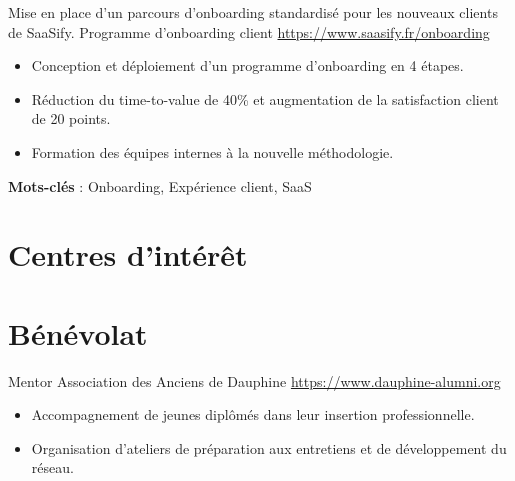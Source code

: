 \documentclass[a4paper, serif, 10pt]{moderncv}
\begin{document}
        {Mise en place d'un parcours d'onboarding standardisé pour les nouveaux clients de SaaSify.}
        {Programme d'onboarding client}
        {\url{https://www.saasify.fr/onboarding}}
        {}
        {\begin{itemize}
\item Conception et déploiement d'un programme d'onboarding en 4 étapes.
\item Réduction du time-to-value de 40\% et augmentation de la satisfaction client de 20 points.
\item Formation des équipes internes à la nouvelle méthodologie.
\end{itemize}
\textbf{Mots-clés} : Onboarding, Expérience client, SaaS}
\section{Centres d'intérêt}

\section{Bénévolat}

        {Mentor}
        {Association des Anciens de Dauphine}
        {\url{https://www.dauphine-alumni.org}}
        {}
        {\begin{itemize}
\item Accompagnement de jeunes diplômés dans leur insertion professionnelle.
\item Organisation d'ateliers de préparation aux entretiens et de développement du réseau.
\end{itemize}}
    
\end{document}
